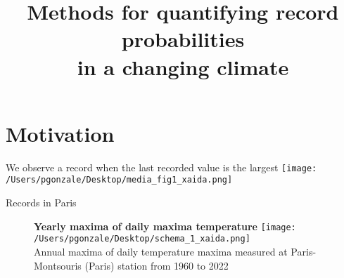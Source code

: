 \documentclass[9pt,compress]{beamer}
\title[ ]%
{\LARGE   
Methods for quantifying record probabilities\\
in a changing climate%
}
\institute[ ]{\normalsize 
\vspace{-1cm}
\begin{center}      
Paula GONZÁLEZ \\
\bigskip   
  
 \texttt{[image:  /Users/pgonzale/Desktop/logo\_all\_slides\_soutenance.png]}\\
\end{center}  
{\tiny  Jury:
\smallskip

{\color{beamer@blendedblue}Pierre RIBEREAU}, Université Claude Bernard Lyon 1 (reviewer)\\
{\color{beamer@blendedblue}Henning RUST}, Freie Universität Berlin (reviewer)\\
{\color{beamer@blendedblue}Juliette BLANCHET}, Université Grenoble Alpes (examiner)\\
{\color{beamer@blendedblue}Daniela CASTRO-CAMILO}, University of Glasgow (examiner)\\
{\color{beamer@blendedblue}Ester MARIUCCI}, Université Paris-Saclay, UVSQ (examiner)\\
{\color{beamer@blendedblue}Mathieu RIBATET}, Université de Nantes (examiner)\\
{\color{beamer@blendedblue}Gwladys TOULEMONDE}, Université de Montpellier (examiner)\\
\medskip

Supervisors:\\
{\color{beamer@blendedblue}Philippe NAVEAU} (LSCE), {\color{beamer@blendedblue}Soulivanh THAO} (LSCE) and {\color{beamer@blendedblue}Julien WORMS} (UVSQ)
\smallskip

}


}
\date{}
\begin{document}
\frame{\vspace*{1.15cm}\titlepage}
%
%
%
\section{Motivation}
\begin{frame}{We observe a record when the last recorded value is the largest}%
\texttt{[image: /Users/pgonzale/Desktop/media\_fig1\_xaida.png]} %
\end{frame}
%
%
%
%
%
%
\begin{frame}{Records in Paris}
\medskip

\begin{figure}
\centering
    {\small\textbf{Yearly maxima of daily maxima temperature}}
\texttt{[image: /Users/pgonzale/Desktop/schema\_1\_xaida.png]}\\
{\tiny Annual maxima of daily temperature maxima measured {at \color{red} Paris-Montsouris (Paris) station}  from 1960 to 2022}
\end{figure}
\end{frame}
\end{document}

